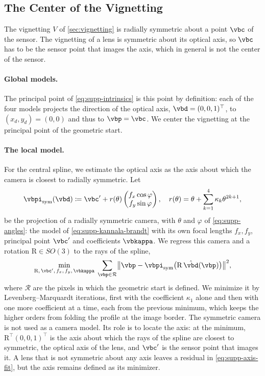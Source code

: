 \subsection{The Center of the Vignetting}
\label{sec:supp-vignetting-center}
The vignetting $V$ of \cref{sec:vignetting} is radially symmetric
about a point $\vbc$ of the sensor. The vignetting of a lens is
symmetric about its optical axis, so $\vbc$ has to be the sensor
point that images the axis, which in general is not the center of
the sensor.

\paragraph{Global models.} The principal point of
\cref{eq:supp-intrinsics} is this point by definition: each of the
four models projects the direction of the optical axis,
$\vbd=(0,0,1)^\top$, to $(x_d,y_d)=(0,0)$ and thus to $\vbp=\vbc$.
We center the vignetting at the principal point of the geometric
start.

\paragraph{The local model.} For the central spline, we estimate the
optical axis as the axis about which the camera is closest to
radially symmetric. Let
\begin{equation}
\label{eq:supp-symmetric-camera}
    \vbpi_{\text{sym}}(\vbd)
    \coloneqq \vbc' + r(\theta)\begin{pmatrix} f_x\cos\varphi\\ f_y\sin\varphi\end{pmatrix},
    \quad
    r(\theta)=\theta+\sum_{k=1}^{4}\kappa_k\theta^{2k+1},
\end{equation}
be the projection of a radially symmetric camera, with $\theta$ and
$\varphi$ of \cref{eq:supp-angles}: the model of
\cref{eq:supp-kannala-brandt} with its own focal lengths $f_x,f_y$,
principal point $\vbc'$ and coefficients $\vbkappa$. We regress this
camera and a rotation $\mathrm{R}\in SO(3)$ to the rays of the
spline,
\begin{equation}
\label{eq:supp-axis-fit}
    \min_{\mathrm{R},\,\vbc',\,f_x,\,f_y,\,\vbkappa}\;
    \sum_{\vbp\in\mathcal{R}}
    \bigl\lVert \vbp-\vbpi_{\text{sym}}\bigl(\mathrm{R}\,\hat{\vbd}(\vbp)\bigr)\bigr\rVert^{2},
\end{equation}
where $\mathcal{R}$ are the pixels in which the geometric start is
defined. We minimize it by Levenberg--Marquardt iterations, first
with the coefficient $\kappa_1$ alone and then with one more
coefficient at a time, each from the previous minimum, which keeps
the higher orders from folding the profile at the image border. The
symmetric camera is not used as a camera model. Its role is to
locate the axis: at the minimum, $\mathrm{R}^\top(0,0,1)^\top$ is the
axis about which the rays of the spline are closest to symmetric,
the optical axis of the lens, and $\vbc'$ is the sensor point that
images it. A lens that is not symmetric about any axis leaves a
residual in \cref{eq:supp-axis-fit}, but the axis remains defined as
its minimizer.

